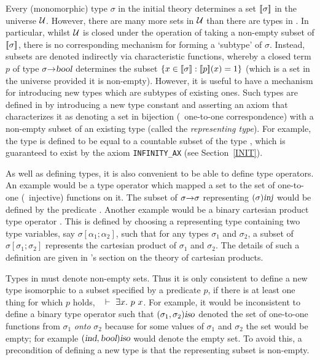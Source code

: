 Every (monomorphic) type $\sigma$ in the initial theory 
determines a set $[\![\sigma]\!]$ in the universe $\cal U$. However,
there are many more sets in $\cal U$ than there are types in
.  In particular, whilst $\cal U$ is closed under the
operation of taking a non-empty subset of $[\![\sigma]\!]$, there is no
corresponding mechanism for forming a `subtype' of $\sigma$. Instead,
subsets are denoted indirectly via characteristic functions, whereby a
closed term $p$ of type $\sigma{\to}\textsl{bool}$ determines the subset
$\{x\in[\![\sigma]\!] : [\![p]\!](x)=1\}$ (which is a set in the universe
provided it is non-empty).  However, it is useful to have a
mechanism for introducing new types which are subtypes of existing
ones. Such types are defined in \HOL{} by introducing a new type
constant and asserting an axiom that characterizes it as denoting a
set in bijection (\ie\ one-to-one correspondence) with a non-empty
subset of an existing type (called the {\it representing type\/}).
For example, the type  is defined to be equal to a countable
subset of the type , which is guaranteed to exist by the axiom
{\small\tt INFINITY\_AX} (see Section~\ref{INIT}).

As well as defining types, it is also convenient to be able to define
type operators.  An example would be a type operator  which
mapped a set to the set of one-to-one (\ie\ injective) functions on
it.  The subset of $\sigma{\to}\sigma$ representing $(\sigma)\textsl{inj}$
would be defined by the predicate \OneOne.  Another example would be a
binary cartesian product type operator .  This is defined by
choosing a representing type containing two type variables, say
$\sigma[\alpha_1;\alpha_2]$, such that for any types $\sigma_1$ and
$\sigma_2$, a subset of $\sigma[\sigma_1;\sigma_2]$ represents the
cartesian product of $\sigma_1$ and $\sigma_2$.  The details of such a
definition are given in \DESCRIPTION's section on the theory of
cartesian products.

Types in \HOL{} must denote non-empty sets.  Thus it is only
consistent to define a new type isomorphic to a
subset specified by a predicate $p$, if there is at least one thing
for which $p$ holds, \ie\ $\ \vdash\ \exists x.\ p\ x$.  For example, it
would be inconsistent to define a binary type operator  such
that $(\sigma_1,\sigma_2)\textsl{iso}$ denoted the set of one-to-one
functions from $\sigma_1$ {\em onto\/} $\sigma_2$ because for some
values of $\sigma_1$ and $\sigma_2$ the set would be empty; for
example $(\textsl{ind},\textsl{bool})\textsl{iso}$ would denote the empty set.  To
avoid this, a precondition of defining a new type is that the
representing subset is non-empty.


